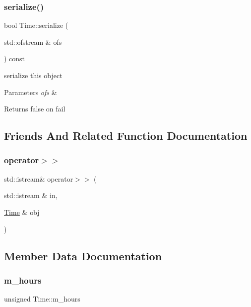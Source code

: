 \subsubsection{\texorpdfstring{serialize()}{serialize()}}
{\footnotesize\ttfamily bool Time\+::serialize (\begin{DoxyParamCaption}\item[{std\+::ofstream \&}]{ofs }\end{DoxyParamCaption}) const}

serialize this object 
\begin{DoxyParams}{Parameters}
{\em ofs} & \\
\hline
\end{DoxyParams}
\begin{DoxyReturn}{Returns}
false on fail 
\end{DoxyReturn}


\subsection{Friends And Related Function Documentation}
\mbox{\label{classTime_ae4ac864187eab9a6a954dd4213ec49fa}} 
\subsubsection{\texorpdfstring{operator$>$$>$}{operator>>}}
{\footnotesize\ttfamily std\+::istream\& operator$>$$>$ (\begin{DoxyParamCaption}\item[{std\+::istream \&}]{in,  }\item[{\hyperlink{classTime}{Time} \&}]{obj }\end{DoxyParamCaption})\hspace{0.3cm}{\ttfamily [friend]}}



\subsection{Member Data Documentation}
\mbox{\label{classTime_a75b303219e28be4ef13dfb64e9a715b1}} 
\subsubsection{\texorpdfstring{m\+\_\+hours}{m\_hours}}
{\footnotesize\ttfamily unsigned Time\+::m\+\_\+hours\hspace{0.3cm}{\ttfamily [private]}}

